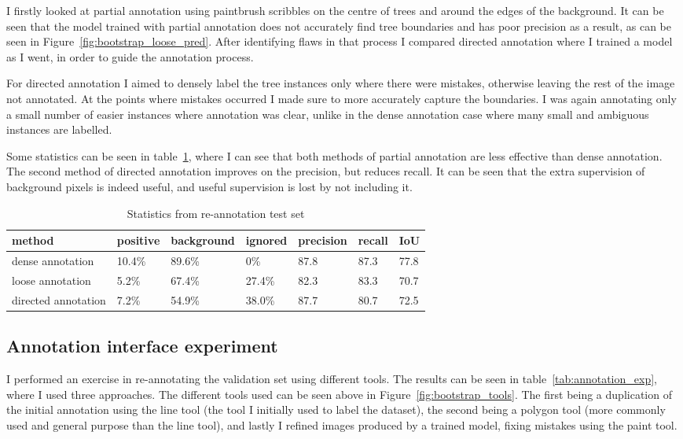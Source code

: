 I firstly looked at partial annotation using paintbrush scribbles on the centre of trees and around the edges of the background. It can be seen that the model trained with partial annotation does not accurately find tree boundaries and has poor precision as a result, as can be seen in Figure~\ref{fig:bootstrap_loose_pred}. After identifying flaws in that process I compared directed annotation where I trained a model as I went, in order to guide the annotation process.

For directed annotation I aimed to densely label the tree instances only where there were mistakes, otherwise leaving the rest of the image not annotated. At the points where mistakes occurred I made sure to more accurately capture the boundaries. I was again annotating only a small number of easier instances where annotation was clear, unlike in the dense annotation case where many small and ambiguous instances are labelled.

Some statistics can be seen in table~\ref{tab:loose_exp}, where I can see that both methods of partial annotation are less effective than dense annotation. The second method of directed annotation improves on the precision, but reduces recall. It can be seen that the extra supervision of background pixels is indeed useful, and useful supervision is lost by not including it.


\begin{table}[!ht]
  \centering
    \caption{Statistics from re-annotation test set}
    
  \begin{tabular}{ l  l  l l l l l }
    method & positive & background & ignored & precision & recall & IoU  \\
    \toprule
    dense annotation	& 10.4\% & 89.6\% & 0\% & 87.8 & 87.3 & 77.8 \\
    loose annotation	& 5.2\% & 67.4\% & 27.4\% & 82.3 & 83.3 & 70.7 \\
    directed annotation & 7.2\% & 54.9\% & 38.0\% & 87.7 & 80.7 & 72.5 \\    
    \bottomrule
  \end{tabular}

\label{tab:loose_exp}
\end{table}

\subsection {Annotation interface experiment}

I performed an exercise in re-annotating the validation set using different tools. The results can be seen in table~\ref{tab:annotation_exp}, where I used three approaches. The different tools used can be seen above in Figure~\ref{fig:bootstrap_tools}.  The first being a duplication of the initial annotation using the line tool (the tool I initially used to label the dataset), the second being a polygon tool (more commonly used and general purpose than the line tool), and lastly I refined images produced by a trained model, fixing mistakes using the paint tool.

